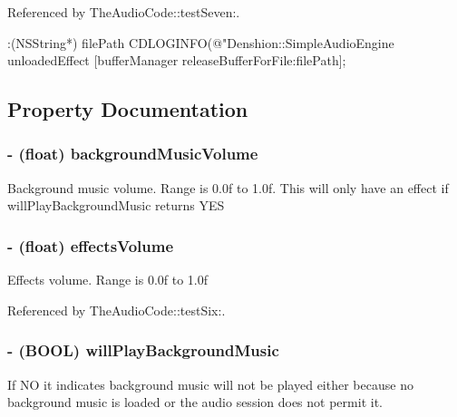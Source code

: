 Referenced by The\-Audio\-Code\-::test\-Seven\-:.


\begin{DoxyCode}
                    :(NSString*) filePath
{
        CDLOGINFO(@"Denshion::SimpleAudioEngine unloadedEffect %
        [bufferManager releaseBufferForFile:filePath];
}
\end{DoxyCode}


\subsection{Property Documentation}
\hypertarget{interface_simple_audio_engine_a7e28cfae58e49d3b6dd4a1ca9b8b54b5}{
\subsubsection[{background\-Music\-Volume}]{\setlength{\rightskip}{0pt plus 5cm}-\/ (float) {\bf background\-Music\-Volume}}}\label{interface_simple_audio_engine_a7e28cfae58e49d3b6dd4a1ca9b8b54b5}
Background music volume. Range is 0.\-0f to 1.\-0f. This will only have an effect if will\-Play\-Background\-Music returns Y\-E\-S \hypertarget{interface_simple_audio_engine_a0c529082c00086142cdc19b92098453a}{
\subsubsection[{effects\-Volume}]{\setlength{\rightskip}{0pt plus 5cm}-\/ (float) {\bf effects\-Volume}}}\label{interface_simple_audio_engine_a0c529082c00086142cdc19b92098453a}
Effects volume. Range is 0.\-0f to 1.\-0f 

Referenced by The\-Audio\-Code\-::test\-Six\-:.

\hypertarget{interface_simple_audio_engine_a2838b12d2c986358cb16d7527ad644ac}{
\subsubsection[{will\-Play\-Background\-Music}]{\setlength{\rightskip}{0pt plus 5cm}-\/ (B\-O\-O\-L) {\bf will\-Play\-Background\-Music}}}\label{interface_simple_audio_engine_a2838b12d2c986358cb16d7527ad644ac}
If N\-O it indicates background music will not be played either because no background music is loaded or the audio session does not permit it. 

